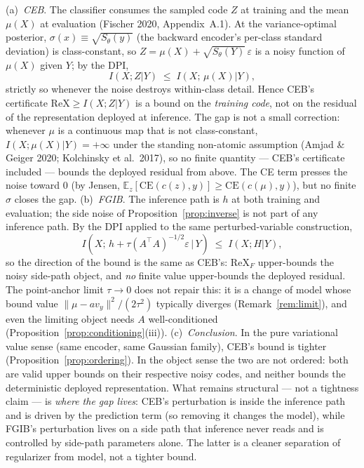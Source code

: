 \begin{proposition}\label{prop:object}
(a)~\emph{CEB}. The classifier consumes the sampled code $Z$ at training and the mean
$\mu(X)$ at evaluation (Fischer 2020, Appendix~A.1). At the variance-optimal posterior,
$\sigma(x) \equiv \sqrt{S_\theta(y)}$ (the backward encoder's per-class standard
deviation) is class-constant, so $Z = \mu(X) + \sqrt{S_\theta(Y)}\,\varepsilon$ is a
noisy function of $\mu(X)$ given $Y$; by the DPI,
\begin{equation}
I(X; Z | Y) \;\le\; I(X;\, \mu(X) | Y) ,
\label{eq:dpi}
\end{equation}
strictly so whenever the noise destroys within-class detail. Hence CEB's certificate
$\mathrm{ReX} \ge I(X;Z|Y)$ is a bound on the \emph{training code}, not on the residual
of the representation deployed at inference. The gap is not a small correction: whenever
$\mu$ is a continuous map that is not class-constant, $I(X;\mu(X)|Y) = +\infty$ under
the standing non-atomic assumption (Amjad \& Geiger 2020; Kolchinsky et al.\ 2017), so
no finite quantity --- CEB's certificate included --- bounds the deployed residual from
above. The CE term presses the noise
toward $0$ (by Jensen, $\mathbb{E}_z[\mathrm{CE}(c(z),y)] \ge \mathrm{CE}(c(\mu),y)$),
but no finite $\sigma$ closes the gap.
(b)~\emph{FGIB}. The inference path is $h$ at both training and evaluation; the side
noise of Proposition~\ref{prop:inverse} is not part of any inference path. By the DPI
applied to the same perturbed-variable construction,
\begin{equation}
I(X;\, h + \tau (A^{\top}A)^{-1/2}\varepsilon \,|\, Y)
\;\le\; I(X; H | Y) ,
\label{eq:dpi-f}
\end{equation}
so the direction of the bound is the same as CEB's: $\mathrm{ReX}_F$ upper-bounds the
noisy side-path object, and \emph{no} finite value upper-bounds the deployed residual.
The point-anchor limit $\tau \to 0$ does not repair this: it is a change of model whose
bound value $\|\mu - a v_y\|^2/(2\tau^2)$ typically diverges
(Remark~\ref{rem:limit}), and even the limiting object needs $A$ well-conditioned
(Proposition~\ref{prop:conditioning}(iii)).
(c)~\emph{Conclusion}. In the pure variational value sense (same encoder, same Gaussian
family), CEB's bound is tighter (Proposition~\ref{prop:ordering}). In the object sense
the two are not ordered: both are valid upper bounds on their respective noisy codes, and
neither bounds the deterministic deployed representation. What remains structural --- not
a tightness claim --- is \emph{where the gap lives}: CEB's perturbation is inside the
inference path and is driven by the prediction term (so removing it changes the model),
while FGIB's perturbation lives on a side path that inference never reads and is
controlled by side-path parameters alone. The latter is a cleaner separation of
regularizer from model, not a tighter bound.
\end{proposition}

